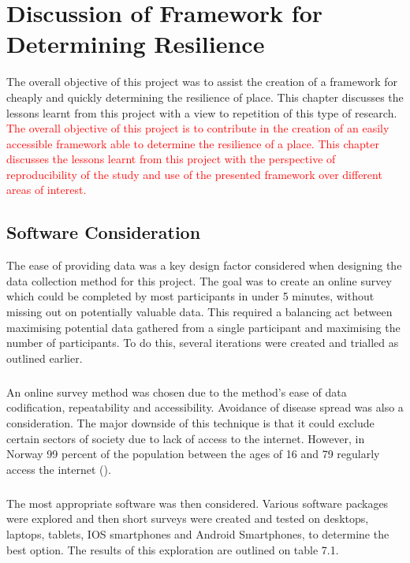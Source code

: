 
\chapter{Discussion of Framework for Determining Resilience}
The overall objective of this project was to assist the creation of a framework for cheaply and quickly determining the resilience of place. This chapter discusses the lessons learnt from this project with a view to repetition of this type of research.
\textcolor{red}{The overall objective of this project is to contribute in the creation of an easily accessible framework able to determine the resilience of a place. This chapter discusses the lessons learnt from this project with the perspective of reproducibility of the study and use of the presented framework over different areas of interest.}

\section{Software Consideration}
The ease of providing data was a key design factor considered when designing the data collection method for this project. The goal was to create an online survey which could be completed by most participants in under 5 minutes, without missing out on potentially valuable data. This required a balancing act between maximising potential data gathered from a single participant and maximising the number of participants. To do this, several iterations were created and trialled as outlined earlier.
\paragraph{}
An online survey method was chosen due to the method's ease of data codification, repeatability and accessibility. Avoidance of disease spread was also a consideration. The major downside of this technique is that it could exclude certain sectors of society due to lack of access to the internet. However, in Norway 99 percent of the population between the ages of 16 and 79 regularly access the internet (\cite{walther-zhang_ict_2022}). 
\paragraph{}
The most appropriate software was then considered.  Various software packages were explored and then short surveys were created and  tested on desktops, laptops, tablets, IOS smartphones and Android Smartphones, to determine the best option. The results of this exploration are outlined on table 7.1.

